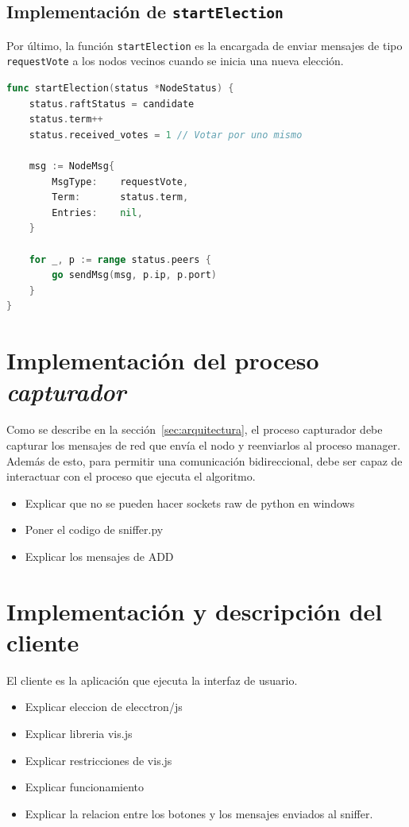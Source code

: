\subsection{Implementación de \texttt{startElection}}

Por último, la función \texttt{startElection} es la encargada de enviar mensajes de tipo \texttt{requestVote} a los nodos vecinos cuando se inicia una nueva elección. 

\begin{lstlisting}[language=go]
func startElection(status *NodeStatus) {
	status.raftStatus = candidate
	status.term++
	status.received_votes = 1 // Votar por uno mismo

	msg := NodeMsg{
		MsgType:    requestVote,
		Term:       status.term,
		Entries:    nil,
	}

	for _, p := range status.peers {
		go sendMsg(msg, p.ip, p.port)
	}
}
\end{lstlisting}

\section{Implementación del proceso \textit{capturador}}

Como se describe en la sección~\ref{sec:arquitectura}, el proceso capturador debe capturar los mensajes de red que envía el nodo y reenviarlos al proceso manager. Además de esto, para permitir una comunicación bidireccional, debe ser capaz de interactuar con el proceso que ejecuta el algoritmo.

\begin{itemize}
\item Explicar que no se pueden hacer sockets raw de python en windows
\item Poner el codigo de sniffer.py
\item Explicar los mensajes de ADD
\end{itemize}

\section{Implementación y descripción del cliente}

El cliente es la aplicación que ejecuta la interfaz de usuario.

\begin{itemize}
\item Explicar eleccion de elecctron/js
\item Explicar libreria vis.js
\item Explicar restricciones de vis.js
\item Explicar funcionamiento\\
\item Explicar la relacion entre los botones y los mensajes enviados al sniffer.
\end{itemize}

